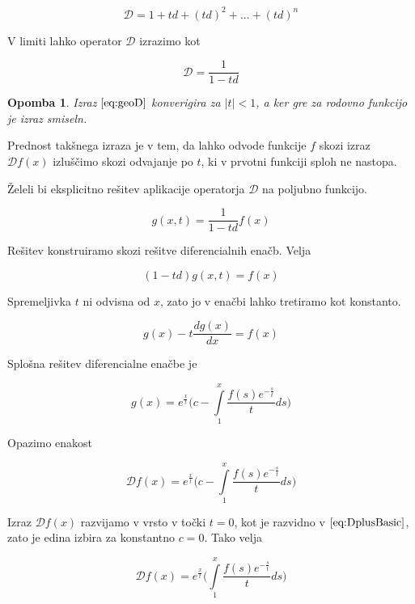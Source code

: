 \documentclass{article}
\newcommand{\Dplus}{\mathcal{D}}
\newtheorem{opomba}{Opomba}[section]
\begin{document}
 \begin{equation}\label{eq:DplusBasic}
 \Dplus=1+td+(td)^2+...+(td)^n
 \end{equation}
 
 V limiti lahko operator $\Dplus$ izrazimo kot
 
 \begin{equation}\label{eq:geoD}
	\Dplus=\frac{1}{1-td}
 \end{equation}
 
 \begin{opomba}
 	Izraz $\eqref{eq:geoD}$ konverigira za $\lvert t\rvert<1$, a ker gre za rodovno funkcijo je izraz smiseln.
 \end{opomba}
 
 Prednost takšnega izraza je v tem, da lahko odvode funkcije $f$ skozi izraz $\Dplus f(x)$ izluščimo skozi odvajanje po $t$, ki v prvotni funkciji sploh ne nastopa.
 
 Želeli bi eksplicitno rešitev aplikacije operatorja $\Dplus$ na poljubno funkcijo.
 
 $$g(x,t)=\frac{1}{1-td} f(x)$$
 
 Rešitev konstruiramo skozi rešitve diferencialnih enačb. Velja
 
 $$(1-td)g(x,t)=f(x)$$
 
 Spremeljivka $t$ ni odvisna od $x$, zato jo v enačbi lahko tretiramo kot konstanto.
 
 $$g(x)-t\frac{dg(x)}{dx}=f(x)$$
 
 Splošna rešitev diferencialne enačbe je
 
 \begin{equation}
 g(x)=e^{\frac{x}{t}}\Big(c-\int\limits_1^x\frac{f(s)e^{-\frac{s}{t}}}{t}ds\Big)
 \end{equation}
 
 Opazimo enakost
 
 \begin{equation}
  \Dplus f(x)=e^{\frac{x}{t}}\Big(c-\int\limits_1^x\frac{f(s)e^{-\frac{s}{t}}}{t}ds\Big)
 \end{equation}
 
 Izraz $\Dplus f(x)$ razvijamo v vrsto v točki $t=0$, kot je razvidno v $\eqref{eq:DplusBasic}$, zato je edina izbira za konstantno $c=0$. Tako velja
 
 \begin{equation}\label{eq:Dplus}
   \Dplus f(x)=e^{\frac{x}{t}}\Big(\int\limits_1^x\frac{f(s)e^{-\frac{s}{t}}}{t}ds\Big)
  \end{equation}
  
\end{document}
